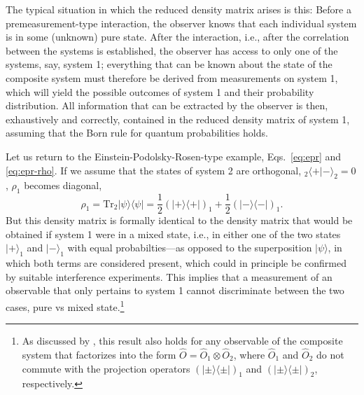 \documentclass[rmp,aps,amsmath,amsfonts,noshowkeys,noshowpacs,12pt]{revtex4}
\newcommand{\ket}[1]{\ensuremath{|{#1\rangle}}}
\newcommand{\bra}[1]{\ensuremath{{\langle #1}|}}
\begin{document}
The typical situation in which the reduced density matrix arises is
this: Before a premeasurement-type interaction, the observer knows
that each individual system is in some (unknown) pure state.  After
the interaction, i.e., after the correlation between the systems is
established, the observer has access to only one of the systems, say,
system 1; everything that can be known about the state of the
composite system must therefore be derived from measurements on system
1, which will yield the possible outcomes of system 1 and their
probability distribution. All information that can be extracted by the
observer is then, exhaustively and correctly, contained in the reduced
density matrix of system 1, assuming that the Born rule for quantum
probabilities holds.

Let us return to the Einstein-Podolsky-Rosen-type example,
Eqs.~\eqref{eq:epr} and \eqref{eq:epr-rho}. If we assume that the
states of system 2 are orthogonal, ${_2\langle +} | - \rangle_2 = 0$,
$\rho_1$ becomes diagonal,
%
\begin{equation}
\rho_1 = \text{Tr}_2 \ket{\psi}\bra{\psi} = \frac{1}{2} (\ket{+}
\bra{+})_1 +  \frac{1}{2}(\ket{-} \bra{-})_1.
\end{equation}
%
But this density matrix is formally identical to the density matrix
that would be obtained if system 1 were in a mixed state, i.e., in
either one of the two states $\ket{+}_1$ and $\ket{-}_1$ with equal
probabilties---as opposed to the superposition $\ket{\psi}$, in which
both terms are considered present, which could in principle be
confirmed by suitable interference experiments.  This implies that a
measurement of an observable that only pertains to system 1 cannot
discriminate between the two cases, pure vs mixed state.\footnote{As
  discussed by \citet[pp.~208--210]{Bub:1997:iq}, this result also
  holds for any observable of the composite system that factorizes
  into the form $\widehat{O}=\widehat{O}_1 \otimes \widehat{O}_2$,
  where $\widehat{O}_1$ and $\widehat{O}_2$ do not commute with the
  projection operators $(\ket{\pm}\bra{\pm})_1$ and
  $(\ket{\pm}\bra{\pm})_2$, respectively.}
\end{document}
